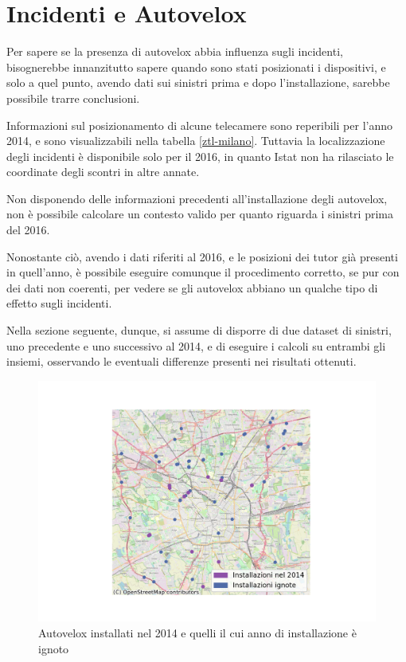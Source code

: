 \documentclass[a4paper,12pt]{report}
\begin{document}
\section{Incidenti e Autovelox}

Per sapere se la presenza di autovelox abbia influenza sugli incidenti, 
bisognerebbe innanzitutto sapere quando sono stati posizionati i dispositivi, e solo 
a quel punto, avendo dati sui sinistri prima e dopo l'installazione, sarebbe 
possibile trarre conclusioni. 

Informazioni sul posizionamento di alcune telecamere sono reperibili per 
l'anno 2014, e sono visualizzabili nella tabella \ref{ztl-milano}. 
Tuttavia la localizzazione degli incidenti 
è disponibile solo per il 2016, in quanto Istat non ha rilasciato 
le coordinate degli scontri in altre annate. 


Non disponendo delle informazioni precedenti all'installazione degli autovelox, 
non è possibile calcolare un contesto valido per quanto riguarda 
i sinistri prima del 2016. 

Nonostante ciò, avendo i dati riferiti al 2016, e le posizioni dei tutor 
già presenti in quell'anno, è possibile eseguire comunque il procedimento corretto, 
se pur con dei dati non coerenti, per vedere se gli 
autovelox abbiano un qualche tipo di effetto sugli incidenti.

Nella sezione seguente, dunque, si assume di disporre di due dataset di sinistri, uno 
precedente e uno successivo al 2014, e di eseguire i calcoli su entrambi gli insiemi, 
osservando le eventuali differenze presenti nei risultati ottenuti.

\begin{figure}
    \includegraphics[width=\linewidth]{../src/autovelox/autovelox_2014.png}
    \caption{Autovelox installati nel 2014 e quelli il cui anno di installazione è ignoto}
    \label{fig:autovelox-indici}
\end{figure}
\end{document}
